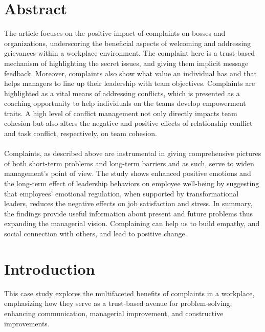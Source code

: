 \documentclass[a4paper,12pt]{article}
\begin{document}
\section*{Abstract}
The article focuses on the positive impact of complaints on bosses and organizations, underscoring the beneficial aspects of welcoming and addressing grievances within a workplace environment. The complaint here is a trust-based mechanism of highlighting the secret issues, and giving them implicit message feedback. Moreover, complaints also show what value an individual has and that helps managers to line up their leadership with team objectives. Complaints are highlighted as a vital means of addressing conflicts, which is presented as a coaching opportunity to help individuals on the teams develop empowerment traits. A high level of conflict management not only directly impacts team cohesion but also alters the negative and positive effects of relationship conflict and task conflict, respectively, on team cohesion\cite{conflict_management}.
\\\\
Complaints, as described above are instrumental in giving comprehensive pictures of both short-term problems and long-term barriers and as such, serve to widen management's point of view. The study shows enhanced positive emotions and the long-term effect of leadership behaviors on employee well-being by suggesting that employees' emotional regulation, when supported by transformational leaders, reduces the negative effects on job satisfaction and stress\cite{workplace_emotions}. In summary, the findings provide useful information about present and future problems thus expanding the managerial vision. Complaining can help us to build empathy, and social connection with others, and lead to positive change\cite{benefits_complain}.
\newpage
\section{Introduction}
This case study explores the multifaceted benefits of complaints in a workplace, emphasizing how they serve as a trust-based avenue for problem-solving, enhancing communication, managerial improvement, and constructive improvements.
\end{document}

